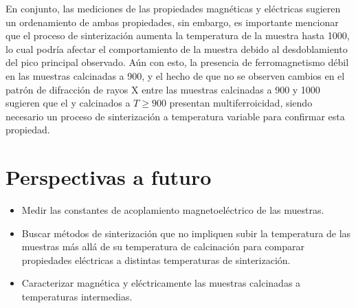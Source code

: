 \documentclass[../main.tex]{subfiles}
\begin{document}
En conjunto, las mediciones de las propiedades magnéticas y eléctricas sugieren un ordenamiento de ambas propiedades, sin embargo, es importante mencionar que el proceso de sinterización aumenta la temperatura de la muestra hasta 1000\gradoC{}, lo cual podría afectar el comportamiento de la muestra debido al desdoblamiento del pico principal observado. Aún con esto, la presencia de ferromagnetismo débil en las muestras calcinadas a 900\gradoC{}, y el hecho de que no se observen cambios en el patrón de difracción de rayos X entre las muestras calcinadas a 900 y 1000\gradoC{} sugieren que el \neod{} y \sama{} calcinados a $T\geq900$\gradoC{} presentan multiferroicidad, siendo necesario un proceso de sinterización a temperatura variable para confirmar esta propiedad.
\section{Perspectivas a futuro}
\begin{itemize}
    \item Medir las constantes de acoplamiento magnetoeléctrico de las muestras.
    \item Buscar métodos de sinterización que no impliquen subir la temperatura de las muestras más allá de su temperatura de calcinación para comparar propiedades eléctricas a distintas temperaturas de sinterización.
    \item Caracterizar magnética y eléctricamente las muestras calcinadas a temperaturas intermedias.
\end{itemize}
\end{document}
